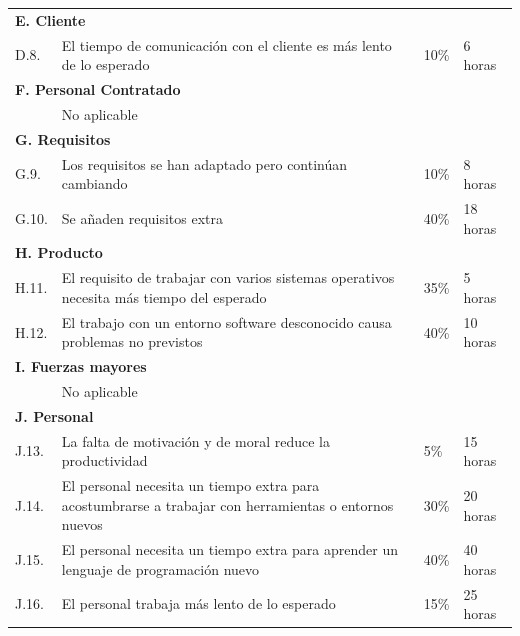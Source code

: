 \begin{longtable}{p{1cm} p{8cm} p{3cm} p{2cm}}
		\multicolumn{4}{l}{\cellcolor{gray!25}\textbf{E. Cliente}}\\
		D.8. &El tiempo de comunicación con el cliente es más lento de lo esperado			&	10\%	&	6 horas\\
		
		\multicolumn{4}{l}{\cellcolor{gray!25}\textbf{F. Personal Contratado}}\\
		&No aplicable&&\\
		
		\multicolumn{4}{l}{\cellcolor{gray!25}\textbf{G. Requisitos}}\\
		G.9. &Los requisitos se han adaptado pero continúan cambiando							&	10\%	& 8 horas\\
		G.10. &Se añaden requisitos extra														&	40\%	& 18 horas\\
		
		\multicolumn{4}{l}{\cellcolor{gray!25}\textbf{H. Producto}}\\ 
		H.11. &El requisito de trabajar con varios sistemas operativos necesita más tiempo del esperado	&	35\%	& 5 horas\\
		H.12. &El trabajo con un entorno software desconocido causa problemas no previstos	&	40\%	& 10 horas\\
	
		\multicolumn{4}{l}{\cellcolor{gray!25}\textbf{I. Fuerzas mayores}}\\
		&No aplicable&&\\	
		
		\multicolumn{4}{l}{\cellcolor{gray!25}\textbf{J. Personal}}\\
		J.13. &La falta de motivación y de moral reduce la productividad						&	5\%		& 15 horas\\
		J.14. &El personal necesita un tiempo extra para acostumbrarse a trabajar con herramientas o entornos nuevos	&	30\%	&	20 horas\\
		J.15. &El personal necesita un tiempo extra para aprender un lenguaje de programación nuevo	&	40\%	&	40 horas\\
		J.16. &El personal trabaja más lento de lo esperado									&	15\%	&	25 horas\\
		

\end{longtable}
